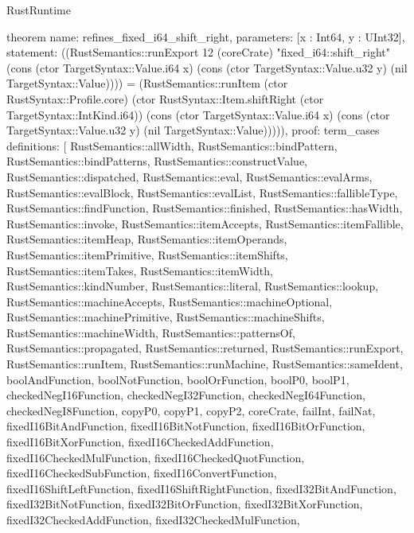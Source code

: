 \begin{lexlean}{RustRuntime}
\begin{semanticmodule}
theorem{
  name: refines_fixed_i64_shift_right,
  parameters: [x : Int64, y : UInt32],
  statement: ((RustSemantics::runExport 12 (coreCrate) "fixed_i64::shift_right" (cons (ctor TargetSyntax::Value.i64 x) (cons (ctor TargetSyntax::Value.u32 y) (nil TargetSyntax::Value)))) = (RustSemantics::runItem (ctor RustSyntax::Profile.core) (ctor RustSyntax::Item.shiftRight (ctor TargetSyntax::IntKind.i64)) (cons (ctor TargetSyntax::Value.i64 x) (cons (ctor TargetSyntax::Value.u32 y) (nil TargetSyntax::Value))))),
  proof: term_cases{
    definitions: [
      RustSemantics::allWidth,
      RustSemantics::bindPattern,
      RustSemantics::bindPatterns,
      RustSemantics::constructValue,
      RustSemantics::dispatched,
      RustSemantics::eval,
      RustSemantics::evalArms,
      RustSemantics::evalBlock,
      RustSemantics::evalList,
      RustSemantics::fallibleType,
      RustSemantics::findFunction,
      RustSemantics::finished,
      RustSemantics::hasWidth,
      RustSemantics::invoke,
      RustSemantics::itemAccepts,
      RustSemantics::itemFallible,
      RustSemantics::itemHeap,
      RustSemantics::itemOperands,
      RustSemantics::itemPrimitive,
      RustSemantics::itemShifts,
      RustSemantics::itemTakes,
      RustSemantics::itemWidth,
      RustSemantics::kindNumber,
      RustSemantics::literal,
      RustSemantics::lookup,
      RustSemantics::machineAccepts,
      RustSemantics::machineOptional,
      RustSemantics::machinePrimitive,
      RustSemantics::machineShifts,
      RustSemantics::machineWidth,
      RustSemantics::patternsOf,
      RustSemantics::propagated,
      RustSemantics::returned,
      RustSemantics::runExport,
      RustSemantics::runItem,
      RustSemantics::runMachine,
      RustSemantics::sameIdent,
      boolAndFunction,
      boolNotFunction,
      boolOrFunction,
      boolP0,
      boolP1,
      checkedNegI16Function,
      checkedNegI32Function,
      checkedNegI64Function,
      checkedNegI8Function,
      copyP0,
      copyP1,
      copyP2,
      coreCrate,
      failInt,
      failNat,
      fixedI16BitAndFunction,
      fixedI16BitNotFunction,
      fixedI16BitOrFunction,
      fixedI16BitXorFunction,
      fixedI16CheckedAddFunction,
      fixedI16CheckedMulFunction,
      fixedI16CheckedQuotFunction,
      fixedI16CheckedSubFunction,
      fixedI16ConvertFunction,
      fixedI16ShiftLeftFunction,
      fixedI16ShiftRightFunction,
      fixedI32BitAndFunction,
      fixedI32BitNotFunction,
      fixedI32BitOrFunction,
      fixedI32BitXorFunction,
      fixedI32CheckedAddFunction,
      fixedI32CheckedMulFunction,
}}
\end{semanticmodule}
\end{lexlean}

